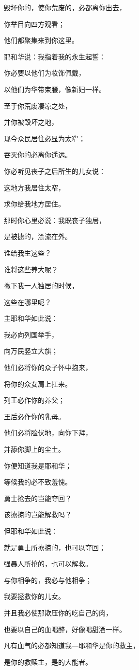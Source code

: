 {\par }{\Q 毁坏你的，使你荒废的，必都离你出去，
\par }{\Q {}你举目向四方观看；
\par }{\Q 他们都聚集来到你这里。
\par }{\Q 耶和华说：我指着我的永生起誓：
\par }{\Q 你必要以他们为妆饰佩戴，
\par }{\Q 以他们为华带束腰，像新妇一样。
\par }{\BB \par }{\Q {}至于你荒废凄凉之处，
\par }{\Q 并你被毁坏之地，
\par }{\Q 现今众民居住必显为太窄；
\par }{\Q 吞灭你的必离你遥远。
\par }{\Q {}你必听见丧子之后所生的儿女说：
\par }{\Q 这地方我居住太窄，
\par }{\Q 求你给我地方居住。
\par }{\Q {}那时你心里必说：我既丧子独居，
\par }{\Q 是被掳的，漂流在外。
\par }{\Q 谁给我生这些？
\par }{\Q 谁将这些养大呢？
\par }{\Q 撇下我一人独居的时候，
\par }{\Q 这些在哪里呢？
\par }{\BB \par }{\Q {}主耶和华如此说：
\par }{\Q 我必向列国举手，
\par }{\Q 向万民竖立大旗；
\par }{\Q 他们必将你的众子怀中抱来，
\par }{\Q 将你的众女肩上扛来。
\par }{\Q {}列王必作你的养父；
\par }{\Q 王后必作你的乳母。
\par }{\Q 他们必将脸伏地，向你下拜，
\par }{\Q 并舔你脚上的尘土。
\par }{\Q 你便知道我是耶和华；
\par }{\Q 等候我的必不致羞愧。
\par }{\BB \par }{\Q {}勇士抢去的岂能夺回？
\par }{\Q 该掳掠的岂能解救吗？
\par }{\Q {}但耶和华如此说：
\par }{\Q 就是勇士所掳掠的，也可以夺回；
\par }{\Q 强暴人所抢的，也可以解救。
\par }{\Q 与你相争的，我必与他相争；
\par }{\Q 我要拯救你的儿女。
\par }{\Q {}并且我必使那欺压你的吃自己的肉，
\par }{\Q 也要以自己的血喝醉，好像喝甜酒一样。
\par }{\Q 凡有血气的必都知道我—耶和华是你的救主，
\par }{\Q 是你的救赎主，是{}的大能者。

}
